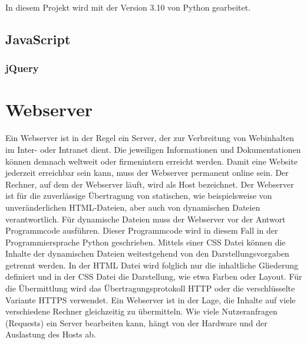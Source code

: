 In diesem Projekt wird mit der Version 3.10 von Python gearbeitet. \cite{Python} \cite{DataToolkit}

\subsection{JavaScript}

\subsubsection{jQuery}


\section{Webserver}
Ein Webserver ist in der Regel ein Server, der zur Verbreitung von Webinhalten im Inter- oder Intranet dient. Die jeweiligen Informationen und Dokumentationen können demnach weltweit oder firmenintern erreicht werden. Damit eine Website jederzeit erreichbar sein kann, muss der Webserver permanent online sein.
Der Rechner, auf dem der Webserver läuft, wird als Host bezeichnet. Der Webserver ist für die zuverlässige Übertragung von statischen, wie beispielsweise von unveränderlichen \ac{HTML}-Dateien, aber auch von dynamischen Dateien verantwortlich. Für dynamische Dateien muss der Webserver vor der Antwort Programmcode ausführen. Dieser Programmcode wird in diesem Fall in der Programmiersprache Python geschrieben. Mittels einer \ac{CSS} Datei können die Inhalte der dynamischen Dateien weitestgehend von den Darstellungsvorgaben getrennt werden. In der \ac{HTML} Datei wird folglich nur die inhaltliche Gliederung definiert und in der \ac{CSS} Datei die Darstellung, wie etwa Farben oder Layout.
Für die Übermittlung wird das Übertragungsprotokoll \ac{HTTP} oder die verschlüsselte Variante \ac{HTTPS} verwendet.
Ein Webserver ist in der Lage, die Inhalte auf viele verschiedene Rechner gleichzeitig zu übermitteln. Wie viele Nutzeranfragen (Requests) ein Server bearbeiten kann, hängt von der Hardware und der Auslastung des Hosts ab.

